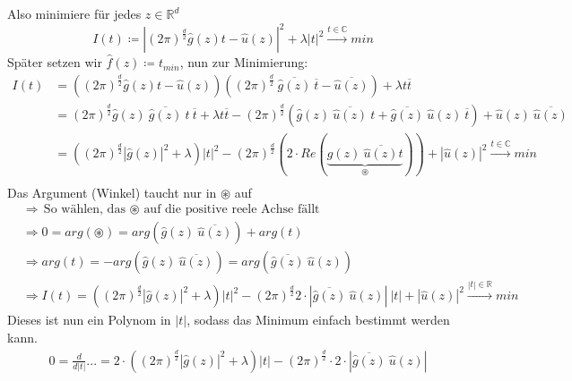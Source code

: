 \documentclass[ngerman]{article}
\theoremstyle{plain}
\theoremstyle{definition}
\numberwithin{equation}{section}
\newcommand{\R}[0] {
\mathbb R
}
\newcommand{\C}[0]{
    \cdot
}
\begin{document}
\begin{enumerate}[label = \arabic*. Ansatz:]
                    Also minimiere für jedes $z \in \R^d$
                    \[I(t) \coloneqq |(2 \pi)^\frac{d}{2} \hat g(z)t - \hat u(z)|^2 + \lambda |t|^2 \overset{t \in \mathbb C}{\longrightarrow}min\]
                    Später setzen wir $\hat f(z) \coloneqq t_{min}$, nun zur Minimierung:
                    \begin{align*}
                        I(t)&=((2 \pi)^\frac{d}{2} \hat g(z) t - \hat u(z))((2 \pi)^\frac{d}{2} \ \overline{\hat g(z)} \ \overline t -\overline{\hat u (z)}) + \lambda t \overline t\\
                        &=(2 \pi)^\frac{d}{2} \hat g(z) \ \overline{\hat g(z)} \ t \ \overline t + \lambda t \overline t - (2 \pi)^\frac{d}{2} (\hat g(z) \ \overline{\hat u(z)} \ t + \overline{\hat g(z)} \ \hat u(z) \ \overline{t}) + \hat u(z) \ \overline{\hat u(z)}\\
                        &=((2 \pi)^\frac{d}{2} |\hat g(z)|^2 + \lambda)|t|^2 - (2 \pi)^\frac{d}{2} (2 \C Re(\underbrace{\hat g(z) \ \overline{\hat u(z)}t}_{\circledast})) + |\hat u(z)|^2 \overset{t \in \mathbb C}{\longrightarrow} min\\
                    \end{align*}
                    Das Argument (Winkel) taucht nur in $\circledast$ auf\\
                    \begin{align*}
                        &\Rightarrow \text{So wählen, das $\circledast$ auf die positive reele Achse fällt}\\
                        &\Rightarrow 0=arg(\circledast)= arg(\hat g(z) \ \overline{\hat u(z)}) + arg(t)\\
                        &\Rightarrow arg(t)=-arg(\hat g(z) \ \overline{\hat u(z)})=arg(\overline{\hat g(z)} \ \hat u(z))\\
                        &\Rightarrow I(t) = ((2\pi)^\frac{d}{2} |\hat g(z)|^2 + \lambda)|t|^2 - (2\pi)^\frac{d}{2} 2 \C |\overline{\hat g(z)} \ \hat u(z)| \ |t| + |\hat u (z)|^2 \overset{|t| \in \R}{\longrightarrow}min
                    \end{align*}
                    Dieses ist nun ein Polynom in $|t|$, sodass das Minimum einfach bestimmt werden kann.\\
                    \begin{align*}
                        &0=\frac{d}{d|t|}...=2\C((2\pi)^\frac{d}{2}|\hat g(z)|^2 + \lambda)|t| - (2\pi)^\frac{d}{2} \C 2 \C |\overline{\hat g(z)} \ \hat u(z)|\\

\end{align*}
\end{enumerate}
\end{document}
